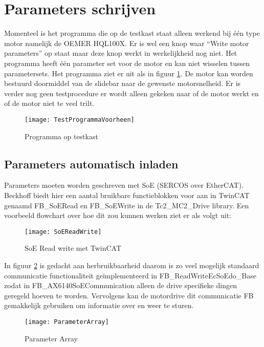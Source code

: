 \section{Parameters schrijven}

Momenteel is het programma die op de testkast staat alleen werkend bij één type motor namelijk de OEMER HQL100X. Er is wel een knop waar “Write motor parameters” op staat maar deze knop werkt in werkelijkheid nog niet. Het programma heeft één parameter set voor de motor en kan niet wisselen tussen parametersets. Het programma ziet er uit als in figuur \ref{fig:TestProgrammaVoorheen}. De motor kan worden bestuurd doormiddel van de slidebar naar de gewenste motorsnelheid. Er is verder nog geen testprocedure er wordt alleen gekeken naar of de motor werkt en of de motor niet te veel trilt.

\begin{figure}[H]
	\centering
	\texttt{[image: TestProgrammaVoorheen]}
	\label{fig:TestProgrammaVoorheen}
	\caption{Programma op testkast}
\end{figure}

\subsection{Parameters automatisch inladen}

Parameters moeten worden geschreven met \gls{SoE} (\gls{SERCOS} over \gls{EtherCAT}). Beckhoff biedt hier een aantal bruikbare functieblokken voor aan in \gls{TwinCAT} genaamd FB\_SoERead en FB\_SoEWrite in de Tc2\_MC2\_Drive library. Een voorbeeld flowchart over hoe dit zou kunnen werken ziet er als volgt uit:

\begin{figure}[H]
	\centering
	\texttt{[image: SoEReadWrite]}
	\label{fig:SoEReadWrite}
	\caption{SoE Read write met TwinCAT}
\end{figure}

In figuur \ref{fig:SoEReadWrite} is gedacht aan herbruikbaarheid daarom is zo veel mogelijk standaard communicatie functionaliteit geïmplementeerd in FB\_ReadWriteEcSoEdo\_Base zodat in FB\_AX6140SoECommunication alleen de drive specifieke dingen geregeld hoeven te worden. Vervolgens kan de motordrive dit communicatie FB gemakkelijk gebruiken om informatie over en weer te sturen.

\begin{figure}[H]
	\centering
	\texttt{[image: ParameterArray]}
	\label{fig:ParameterArray}
	\caption{Parameter Array}
\end{figure}

